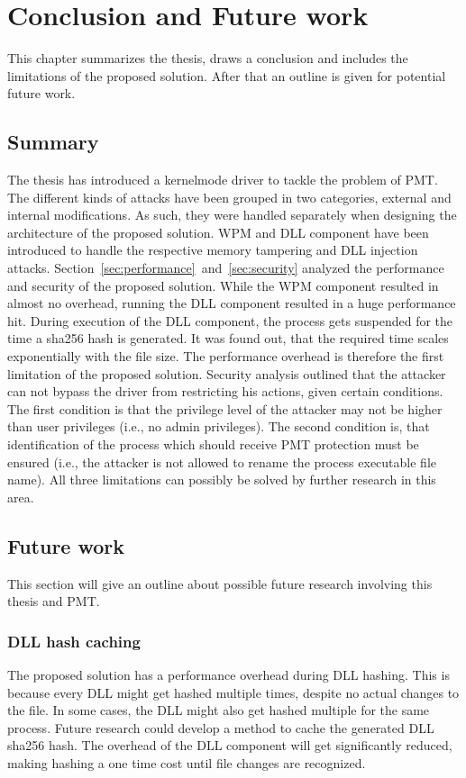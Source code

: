 \section{Conclusion and Future work}
\label{sec:futurework}
This chapter summarizes the thesis, draws a conclusion and includes the limitations of the proposed solution. After that an outline is given for potential future work.
\subsection{Summary}
The thesis has introduced a kernelmode driver to tackle the problem of \gls{PMT}. The different kinds of attacks have been grouped in two categories, external and internal modifications. As such, they were handled separately when designing the architecture of the proposed solution. \gls{WPM} and \gls{DLL} component have been introduced to handle the respective memory tampering and \gls{DLL} injection attacks. Section~\ref{sec:performance}~and~\ref{sec:security} analyzed the performance and security of the proposed solution. While the \gls{WPM} component resulted in almost no overhead, running the \gls{DLL} component resulted in a huge performance hit. During execution of the \gls{DLL} component, the process gets suspended for the time a sha256 hash is generated. It was found out, that the required time scales exponentially with the file size. The performance overhead is therefore the first limitation of the proposed solution. Security analysis outlined that the attacker can not bypass the driver from restricting his actions, given certain conditions. The first condition is that the privilege level of the attacker may not be higher than user privileges (i.e., no admin privileges). The second condition is, that identification of the process which should receive \gls{PMT} protection must be ensured (i.e., the attacker is not allowed to rename the process executable file name). All three limitations can possibly be solved by further research in this area.
\subsection{Future work}
This section will give an outline about possible future research involving this thesis and \gls{PMT}.
\subsubsection{DLL hash caching}
The proposed solution has a performance overhead during \gls{DLL} hashing. This is because every \gls{DLL} might get hashed multiple times, despite no actual changes to the file. In some cases, the \gls{DLL} might also get hashed multiple for the same process. Future research could develop a method to cache the generated \gls{DLL} sha256 hash. The overhead of the \gls{DLL} component will get significantly reduced, making hashing a one time cost until file changes are recognized. 
